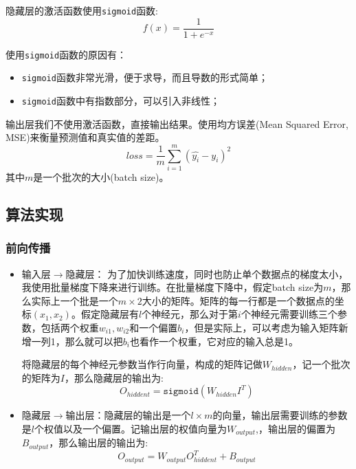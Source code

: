\documentclass[UTF8]{ctexart}
\begin{document}
隐藏层的激活函数使用\texttt{sigmoid}函数:
\begin{equation*}
    f(x) = \frac{1}{1+e^{-x}}
\end{equation*}

使用\texttt{sigmoid}函数的原因有：
\begin{itemize}
    \item \texttt{sigmoid}函数非常光滑，便于求导，而且导数的形式简单；
    \item \texttt{sigmoid}函数中有指数部分，可以引入非线性；
\end{itemize}

输出层我们不使用激活函数，直接输出结果。使用均方误差(Mean Squared Error, MSE)来衡量预测值和真实值的差距。
\begin{equation*}
    loss = \frac{1}{m} \sum_{i=1}^m (\hat{y_i}-y_i)^2
\end{equation*}
其中$m$是一个批次的大小(batch size)。
\subsection{算法实现}
\subsubsection{前向传播}
\begin{itemize}
    \item 输入层$\longrightarrow$隐藏层：
    为了加快训练速度，同时也防止单个数据点的梯度太小，我使用批量梯度下降来进行训练。在批量梯度下降中，假定batch size为$m$，那么实际上一个批是一个$m\times 2$大小的矩阵。矩阵的每一行都是一个数据点的坐标$(x_1,x_2)$。假定隐藏层有$l$个神经元，那么对于第$i$个神经元需要训练三个参数，包括两个权重$w_{i1},w_{i2}$和一个偏置$b_i$，但是实际上，可以考虑为输入矩阵新增一列1，那么就可以把$b_i$也看作一个权重，它对应的输入总是1。

    将隐藏层的每个神经元参数当作行向量，构成的矩阵记做$W_{hidden}$，记一个批次的矩阵为$I$，那么隐藏层的输出为:
    \begin{equation*}
        O_{hiddent} = \texttt{sigmoid}(W_{hidden} I^T)
    \end{equation*}
    \item 隐藏层$\longrightarrow$输出层：隐藏层的输出是一个$l\times m$的向量，输出层需要训练的参数是$l$个权值以及一个偏置。记输出层的权值向量为$W_{output}$,，输出层的偏置为$B_{output}$，那么输出层的输出为:
    \begin{equation*}
        O_{output} = W_{output} O_{hiddent}^T + B_{output}
    \end{equation*}

\end{itemize}
\end{document}
